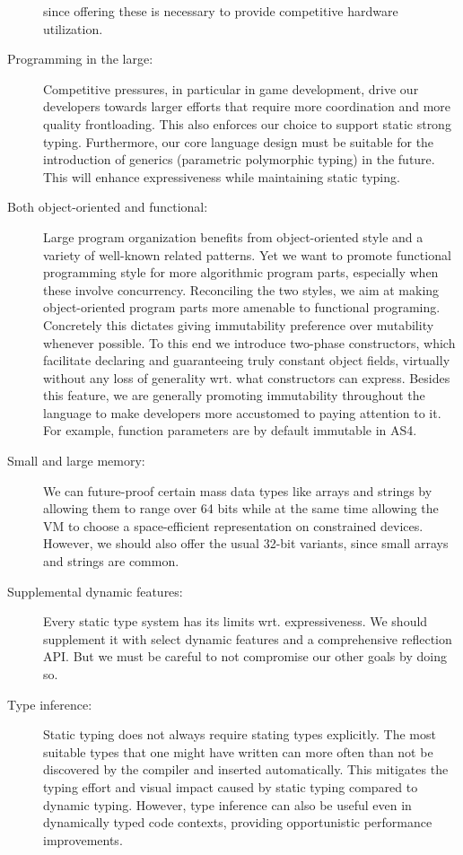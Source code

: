 \begin{description}
since offering these is necessary to provide competitive hardware
utilization.
\item[Programming in the large:] Competitive pressures, in particular in game
development, drive our developers towards larger efforts that require more
coordination and more quality frontloading. This also enforces our choice to
support static strong typing. Furthermore, our core language design must be
suitable for the introduction of generics (parametric polymorphic typing) in the
future. This will enhance expressiveness while maintaining static typing.
\item[Both object-oriented and functional:] Large program organization
benefits from object-oriented style and a variety of well-known related
patterns. Yet we want to promote functional programming style for
more algorithmic program parts, especially when these involve concurrency.
Reconciling the two styles, we aim at making object-oriented program parts more amenable to functional programing.
Concretely this dictates giving immutability preference over mutability
whenever possible. To this end we introduce two-phase constructors, which
facilitate declaring and guaranteeing truly constant object fields, virtually
without any loss of generality wrt. what constructors can express. Besides this
feature, we are generally promoting immutability throughout the language to make
developers more accustomed to paying attention to it. For example, function parameters are by default
immutable in AS4.
\item[Small and large memory:] We can future-proof certain mass data types like
arrays and strings by allowing them to range over 64 bits while at the same time
allowing the VM to choose a space-efficient representation on constrained
devices. However, we should also offer the usual 32-bit variants, since small
arrays and strings are common.
\item[Supplemental dynamic features:] Every static type system has its limits
wrt. expressiveness. We should supplement it with select dynamic features and a
comprehensive reflection API. But we must be careful to not compromise our other
goals by doing so.
\item[Type inference:] Static typing does not always require stating types explicitly. The most
suitable types that one might have written can more often than not be discovered
by the compiler and inserted automatically. This mitigates the typing effort and
visual impact caused by static typing compared to dynamic typing. However, type
inference can also be useful even in dynamically typed code contexts, providing opportunistic
performance improvements.
\end{description}

